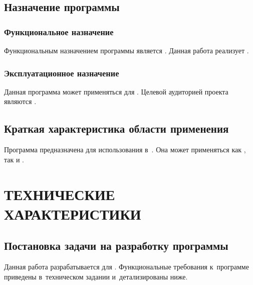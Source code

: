 \documentclass[12pt,a4paper]{extarticle}
\begin{document}
\subsection{Назначение программы}

\subsubsection{Функциональное назначение}

Функциональным назначением программы является . Данная работа реализует .

\subsubsection{Эксплуатационное назначение}

Данная программа может применяться для . Целевой аудиторией проекта являются .

\subsection{Краткая характеристика области применения}

Программа предназначена для использования в~. Она может применяться как , так и .

\clearpage

\section{ТЕХНИЧЕСКИЕ ХАРАКТЕРИСТИКИ}

\subsection{Постановка задачи на разработку программы}

Данная работа разрабатывается для . Функциональные требования к~программе приведены в~техническом задании и~детализированы ниже.
\end{document}
